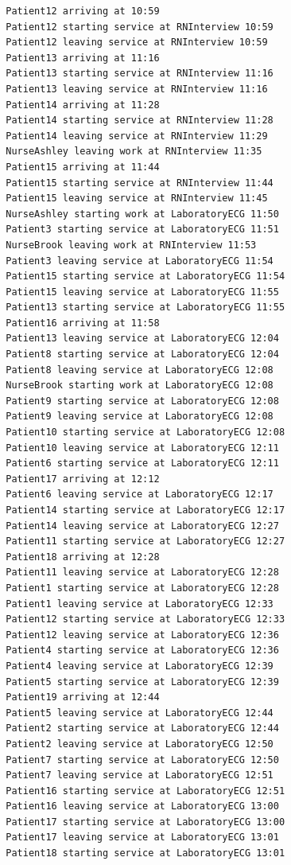 \documentclass[12pt]{article}
\begin{document}
\begin{verbatim}
		Patient12 arriving at 10:59
		Patient12 starting service at RNInterview 10:59
		Patient12 leaving service at RNInterview 10:59
		Patient13 arriving at 11:16
		Patient13 starting service at RNInterview 11:16
		Patient13 leaving service at RNInterview 11:16
		Patient14 arriving at 11:28
		Patient14 starting service at RNInterview 11:28
		Patient14 leaving service at RNInterview 11:29
		NurseAshley leaving work at RNInterview 11:35
		Patient15 arriving at 11:44
		Patient15 starting service at RNInterview 11:44
		Patient15 leaving service at RNInterview 11:45
		NurseAshley starting work at LaboratoryECG 11:50
		Patient3 starting service at LaboratoryECG 11:51
		NurseBrook leaving work at RNInterview 11:53
		Patient3 leaving service at LaboratoryECG 11:54
		Patient15 starting service at LaboratoryECG 11:54
		Patient15 leaving service at LaboratoryECG 11:55
		Patient13 starting service at LaboratoryECG 11:55
		Patient16 arriving at 11:58
		Patient13 leaving service at LaboratoryECG 12:04
		Patient8 starting service at LaboratoryECG 12:04
		Patient8 leaving service at LaboratoryECG 12:08
		NurseBrook starting work at LaboratoryECG 12:08
		Patient9 starting service at LaboratoryECG 12:08
		Patient9 leaving service at LaboratoryECG 12:08
		Patient10 starting service at LaboratoryECG 12:08
		Patient10 leaving service at LaboratoryECG 12:11
		Patient6 starting service at LaboratoryECG 12:11
		Patient17 arriving at 12:12
		Patient6 leaving service at LaboratoryECG 12:17
		Patient14 starting service at LaboratoryECG 12:17
		Patient14 leaving service at LaboratoryECG 12:27
		Patient11 starting service at LaboratoryECG 12:27
		Patient18 arriving at 12:28
		Patient11 leaving service at LaboratoryECG 12:28
		Patient1 starting service at LaboratoryECG 12:28
		Patient1 leaving service at LaboratoryECG 12:33
		Patient12 starting service at LaboratoryECG 12:33
		Patient12 leaving service at LaboratoryECG 12:36
		Patient4 starting service at LaboratoryECG 12:36
		Patient4 leaving service at LaboratoryECG 12:39
		Patient5 starting service at LaboratoryECG 12:39
		Patient19 arriving at 12:44
		Patient5 leaving service at LaboratoryECG 12:44
		Patient2 starting service at LaboratoryECG 12:44
		Patient2 leaving service at LaboratoryECG 12:50
		Patient7 starting service at LaboratoryECG 12:50
		Patient7 leaving service at LaboratoryECG 12:51
		Patient16 starting service at LaboratoryECG 12:51
		Patient16 leaving service at LaboratoryECG 13:00
		Patient17 starting service at LaboratoryECG 13:00
		Patient17 leaving service at LaboratoryECG 13:01
		Patient18 starting service at LaboratoryECG 13:01

\end{verbatim}
\end{document}
